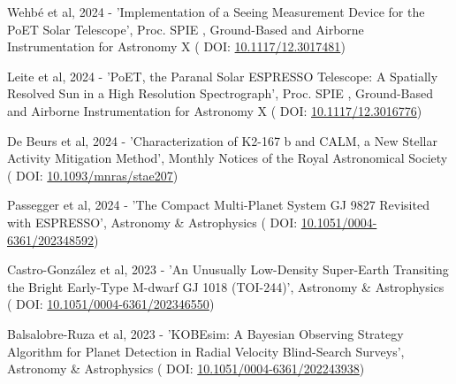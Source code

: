 \vspace*{0.3cm}

  Wehb{\'e} et al, 2024 - 'Implementation of a Seeing Measurement Device for the {{PoET}} Solar Telescope', Proc. SPIE , Ground-Based and {{Airborne Instrumentation}} for {{Astronomy X}} ( \textcolor{MarkerColour!80!black}{\scriptsize\faLink} DOI: \href{http://dx.doi.org/10.1117/12.3017481}{10.1117/12.3017481})

\vspace*{0.3cm}

  Leite et al, 2024 - '{{PoET}}, the {{Paranal}} Solar {{ESPRESSO Telescope}}: A Spatially Resolved {{Sun}} in a High Resolution Spectrograph', Proc. SPIE , Ground-Based and {{Airborne Instrumentation}} for {{Astronomy X}} ( \textcolor{MarkerColour!80!black}{\scriptsize\faLink} DOI: \href{http://dx.doi.org/10.1117/12.3016776}{10.1117/12.3016776})

\vspace*{0.3cm}

  De Beurs et al, 2024 - 'Characterization of {{K2-167}} b and {{CALM}}, a New Stellar Activity Mitigation Method', Monthly Notices of the Royal Astronomical Society ( \textcolor{MarkerColour!80!black}{\scriptsize\faLink} DOI: \href{http://dx.doi.org/10.1093/mnras/stae207}{10.1093/mnras/stae207})

\vspace*{0.3cm}

  Passegger et al, 2024 - 'The Compact Multi-Planet System {{GJ}} 9827 Revisited with {{ESPRESSO}}', Astronomy \& Astrophysics ( \textcolor{MarkerColour!80!black}{\scriptsize\faLink} DOI: \href{http://dx.doi.org/10.1051/0004-6361/202348592}{10.1051/0004-6361/202348592})

\vspace*{0.3cm}

  {Castro-Gonz{\'a}lez} et al, 2023 - 'An Unusually Low-Density Super-{{Earth}} Transiting the Bright Early-Type {{M-dwarf GJ}} 1018 ({{TOI-244}})', Astronomy \& Astrophysics ( \textcolor{MarkerColour!80!black}{\scriptsize\faLink} DOI: \href{http://dx.doi.org/10.1051/0004-6361/202346550}{10.1051/0004-6361/202346550})

\vspace*{0.3cm}

  {Balsalobre-Ruza} et al, 2023 - '{{KOBEsim}}: {{A Bayesian}} Observing Strategy Algorithm for Planet Detection in Radial Velocity Blind-Search Surveys', Astronomy \& Astrophysics ( \textcolor{MarkerColour!80!black}{\scriptsize\faLink} DOI: \href{http://dx.doi.org/10.1051/0004-6361/202243938}{10.1051/0004-6361/202243938})

